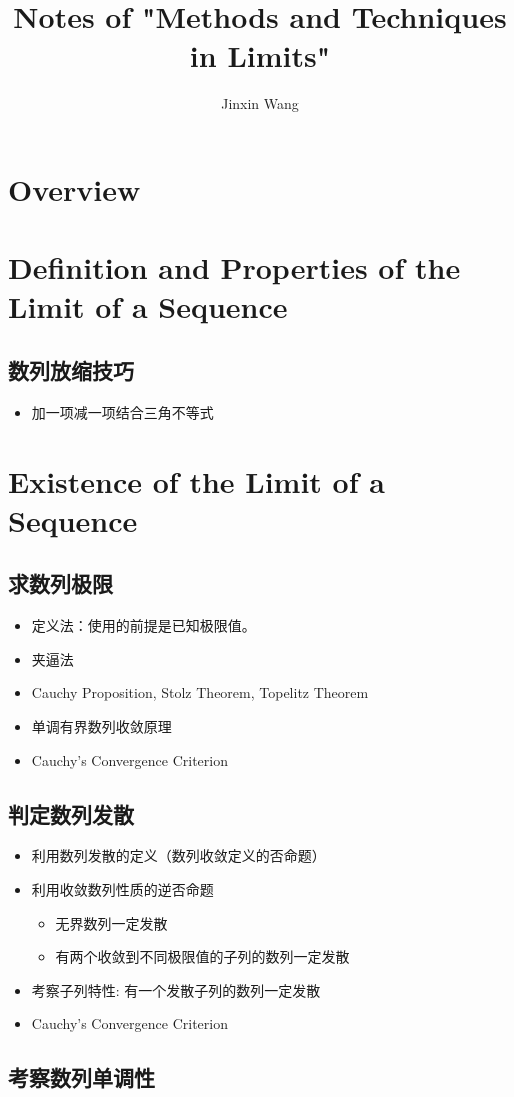 \documentclass[onecolumn]{ctexart}
\title{Notes of "Methods and Techniques in Limits"}
\author{Jinxin Wang}
\date{}
\begin{document}
\maketitle

\section{Overview}

\section{Definition and Properties of the Limit of a Sequence}

\subsection{数列放缩技巧}
\begin{itemize}
  \item 加一项减一项结合三角不等式
\end{itemize}

\section{Existence of the Limit of a Sequence}

\subsection{求数列极限}
\begin{itemize}
  \item 定义法：使用的前提是已知极限值。
  \item 夹逼法
  \item Cauchy Proposition, Stolz Theorem, Topelitz Theorem
  \item 单调有界数列收敛原理
  \item Cauchy's Convergence Criterion
\end{itemize}

\subsection{判定数列发散}
\begin{itemize}
  \item 利用数列发散的定义（数列收敛定义的否命题）
  \item 利用收敛数列性质的逆否命题
  \begin{itemize}
    \item 无界数列一定发散
    \item 有两个收敛到不同极限值的子列的数列一定发散
  \end{itemize}
  \item 考察子列特性: 有一个发散子列的数列一定发散
  \item Cauchy's Convergence Criterion
\end{itemize}

\subsection{考察数列单调性}
\end{document}
